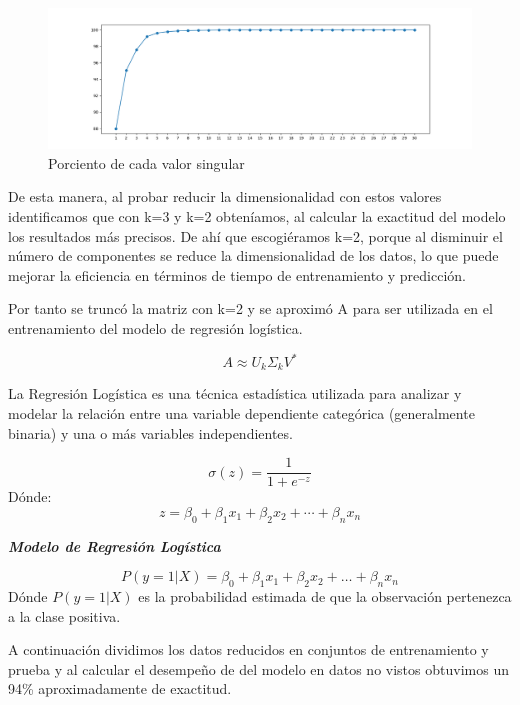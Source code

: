 \documentclass[a4paper,10pt,twocolumn]{article}
\begin{document}
\begin{figure}
    \centering
    \includegraphics[width=1\linewidth]{svd.png}
    \caption{Porciento de cada valor singular}
    \label{fig:enter-label}
\end{figure}

De esta manera, al probar reducir la dimensionalidad con estos valores identificamos que con k=3 y k=2 obteníamos, al calcular la exactitud del modelo los resultados más precisos. De ahí que escogiéramos k=2, porque al disminuir el número de componentes se reduce la dimensionalidad de los datos, lo que puede mejorar la eficiencia en términos de tiempo de entrenamiento y predicción.

Por tanto se truncó la matriz con k=2 y se aproximó A para ser utilizada en el entrenamiento del modelo de regresión logística.

\[
A \approx U_k \Sigma_k V^*
\]

La Regresión Logística es una técnica estadística utilizada para analizar y modelar la relación entre una variable dependiente categórica (generalmente binaria) y una o más variables independientes.

\[
\sigma(z) = \frac{1}{1 + e^{-z}}
\]
Dónde:
\[
z = \beta_0 + \beta_1 x_1 + \beta_2 x_2 + \cdots + \beta_n x_n 
\]

\textbf{\textit{Modelo de Regresión Logística}}

\[
P(y=1|X) = \beta_0+\beta_1x_1+\beta_2x_2+\dots+\beta_nx_n
\]
Dónde $P(y=1|X)$ es la probabilidad estimada de que la observación pertenezca a la clase positiva.


A continuación dividimos los datos reducidos en conjuntos de entrenamiento y prueba y al calcular el desempeño de del modelo en datos no vistos obtuvimos un 94\% aproximadamente de exactitud.
\end{document}
